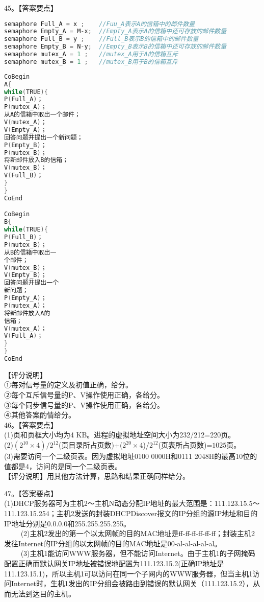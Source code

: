 45。【答案要点】\\
\begin{lstlisting}[language=cpp]
semaphore Full_A = x ;    //Fuu_A表示A的信箱中的邮件数量
semaphore Empty_A = M-x;  //Empty_A表示A的信箱中还可存放的邮件数量
semaphore Full_B = y ;    //Full_B表示B的信箱中的邮件数量
semaphore Empty_B = N-y;  //Empty_B表示B的信箱中还可存放的邮件数量
semaphore mutex_A = 1 ;   //mutex_A用于A的信箱互斥
semaphore mutex_B = 1 ;   //mutex_B用于B的信箱互斥
\end{lstlisting}
\begin{lstlisting}[language=cpp]
CoBegin
A{
while(TRUE){
P(Full_A)；
P(mutex_A)；
从A的信箱中取出一个邮件；
V(mutex_A)；
V(Empty_A)；
回答问题并提出一个新问题；
P(Empty_B)；
P(mutex_B)；
将新邮件放入B的信箱；
V(mutex_B)；
V(Full_B)；
}
}
CoEnd

CoBegin
B{
while(TRUE){
P(Full_B)；
P(mutex_B)；
从B的信箱中取出一
个邮件；
V(mutex_B)；
V(Empty_B)；
回答问题并提出一个
新问题；
P(Empty_A)；
P(mutex_A)；
将新邮件放入A的
信箱；
V(mutex_A)；
V(Full_A)；
}
}
CoEnd
\end{lstlisting}
【评分说明】\\
①每对信号量的定义及初值正确，给分。\\
②每个互斥信号量的P、V操作使用正确，各给分。\\
③每个同步信号量的P、V操作使用正确，各给分。\\
④其他答案酌情给分。\\

46。【答案要点】\\
(1)页和页框大小均为4 KB。进程的虚拟地址空间大小为232/212=220页。\\
(2)$(2^{10}\times4)/2^{12}$(页目录所占页数)+($2^{20}\times4$)/$2^{12}$(页表所占页数)=$1025$页。\\
(3)需要访问一个二级页表。因为虚拟地址0100 0000H和0111 2048H的最高10位的值都是4，访问的是同一个二级页表。\\
【评分说明】用其他方法计算，思路和结果正确同样给分。

47。【答案要点】\\
(1)DHCP服务器可为主机2～主机N动态分配IP地址的最大范围是：111.123.15.5～111.123.15.254；主机2发送的封装DHCPDiscover报文的IP分组的源IP地址和目的IP地址分别是0.0.0.0和255.255.255.255。\\
$\qquad$ (2)主机2发出的第一个以太网帧的目的MAC地址是ff-ff-ff-ff-ff-ff；封装主机2发往Internet的IP分组的以太网帧的目的MAC地址是00-al-al-al-al-al。\\
$\qquad$ (3)主机1能访问WWW服务器，但不能访问Internet。由于主机1的子网掩码配置正确而默认网关IP地址被错误地配置为111.123.15.2(正确IP地址是111.123.15.1)，所以主机1可以访问在同一个子网内的WWW服务器，但当主机1访问Internet时，生机1发出的IP分组会被路由到错误的默认网关（111.123.15.2），从而无法到达目的主机。
